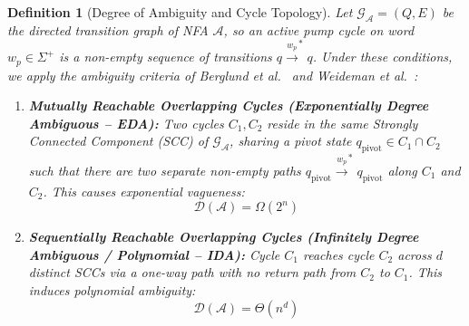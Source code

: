 \documentclass{ieeeaccess}
\newtheorem{definition}{Definition}
\begin{document}
\begin{definition}[Degree of Ambiguity and Cycle Topology]\label{def:ambiguity_degree}
Let $\mathcal{G}_{\mathcal{A}} = (Q, E)$ be the directed transition graph of NFA $\mathcal{A}$, so an active pump cycle on word $w_p \in \Sigma^+$ is a non-empty sequence of transitions $q \xrightarrow{w_p}^* q$. Under these conditions, we apply the ambiguity criteria of Berglund et al.~\cite{berglund2014analyzing} and Weideman et al.~\cite{weideman2016analyzing}:
\begin{enumerate}
    \item \textbf{Mutually Reachable Overlapping Cycles (Exponentially Degree Ambiguous -- EDA):} Two cycles $C_1, C_2$ reside in the same Strongly Connected Component (SCC) of $\mathcal{G}_{\mathcal{A}}$, sharing a pivot state $q_{\mathrm{pivot}} \in C_1 \cap C_2$ such that there are two separate non-empty paths $q_{\mathrm{pivot}} \xrightarrow{w_p}^* q_{\mathrm{pivot}}$ along $C_1$ and $C_2$. This causes exponential vagueness:
    \begin{equation}\label{eq:eda_ambiguity}
    \mathcal{D}(\mathcal{A}) = \Omega(2^n)
    \end{equation}
    \item \textbf{Sequentially Reachable Overlapping Cycles (Infinitely Degree Ambiguous / Polynomial -- IDA):} Cycle $C_1$ reaches cycle $C_2$ across $d$ distinct SCCs via a one-way path with no return path from $C_2$ to $C_1$. This induces polynomial ambiguity:
    \begin{equation}\label{eq:ida_ambiguity}
    \mathcal{D}(\mathcal{A}) = \Theta(n^d)
    \end{equation}
\end{enumerate}
\end{definition}
\end{document}

